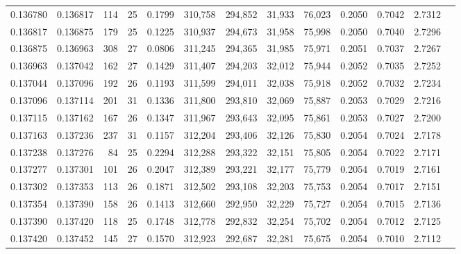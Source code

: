 \begin{tabular}{rrrrrrrrrrrrr}
0.136780 & 0.136817 & 114 &  25 &                                     0.1799 & 310,758 & 294,852 &  31,933 &  76,023 & 0.2050 & 0.7042 & 2.7312 \\
0.136817 & 0.136875 & 179 &  25 &                                     0.1225 & 310,937 & 294,673 &  31,958 &  75,998 & 0.2050 & 0.7040 & 2.7296 \\
0.136875 & 0.136963 & 308 &  27 &                                     0.0806 & 311,245 & 294,365 &  31,985 &  75,971 & 0.2051 & 0.7037 & 2.7267 \\
0.136963 & 0.137042 & 162 &  27 &                                     0.1429 & 311,407 & 294,203 &  32,012 &  75,944 & 0.2052 & 0.7035 & 2.7252 \\
0.137044 & 0.137096 & 192 &  26 &                                     0.1193 & 311,599 & 294,011 &  32,038 &  75,918 & 0.2052 & 0.7032 & 2.7234 \\
0.137096 & 0.137114 & 201 &  31 &                                     0.1336 & 311,800 & 293,810 &  32,069 &  75,887 & 0.2053 & 0.7029 & 2.7216 \\
0.137115 & 0.137162 & 167 &  26 &                                     0.1347 & 311,967 & 293,643 &  32,095 &  75,861 & 0.2053 & 0.7027 & 2.7200 \\
0.137163 & 0.137236 & 237 &  31 &                                     0.1157 & 312,204 & 293,406 &  32,126 &  75,830 & 0.2054 & 0.7024 & 2.7178 \\
0.137238 & 0.137276 &  84 &  25 &                                     0.2294 & 312,288 & 293,322 &  32,151 &  75,805 & 0.2054 & 0.7022 & 2.7171 \\
0.137277 & 0.137301 & 101 &  26 &                                     0.2047 & 312,389 & 293,221 &  32,177 &  75,779 & 0.2054 & 0.7019 & 2.7161 \\
0.137302 & 0.137353 & 113 &  26 &                                     0.1871 & 312,502 & 293,108 &  32,203 &  75,753 & 0.2054 & 0.7017 & 2.7151 \\
0.137354 & 0.137390 & 158 &  26 &                                     0.1413 & 312,660 & 292,950 &  32,229 &  75,727 & 0.2054 & 0.7015 & 2.7136 \\
0.137390 & 0.137420 & 118 &  25 &                                     0.1748 & 312,778 & 292,832 &  32,254 &  75,702 & 0.2054 & 0.7012 & 2.7125 \\
0.137420 & 0.137452 & 145 &  27 &                                     0.1570 & 312,923 & 292,687 &  32,281 &  75,675 & 0.2054 & 0.7010 & 2.7112 \\

\end{tabular}
